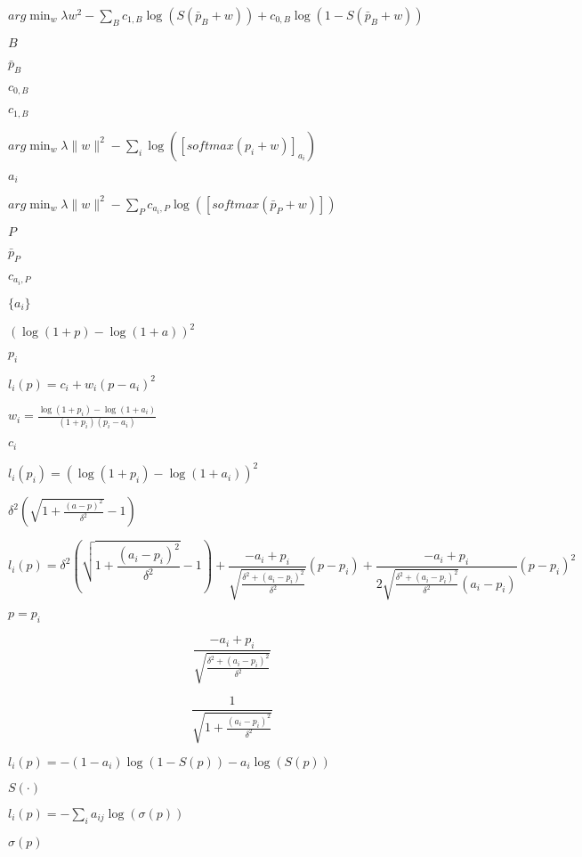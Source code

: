 \documentclass{article}
\begin{document}
$\displaystyle arg\min_w{ \lambda w^2 -\sum_{B}{ c_{1,B} \log(S(\bar{p}_B + w)) + c_{0,B} \log(1 - S(\bar{p}_B + w)) } }$
\pagebreak

$B$
\pagebreak

$\bar{p}_B$
\pagebreak

$c_{0,B}$
\pagebreak

$c_{1,B}$
\pagebreak

$\displaystyle arg\min_w{ \lambda \|w\|^2 -\sum_i{ \log([softmax(p_i + w)]_{a_i}) } }$
\pagebreak

$a_i$
\pagebreak

$\displaystyle arg\min_w{ \lambda \|w\|^2 -\sum_P{ c_{a_i, P} \log([softmax(\bar{p}_P + w)]) } }$
\pagebreak

$P$
\pagebreak

$\bar{p}_P$
\pagebreak

$c_{a_i, P}$
\pagebreak

$\{a_i\}$
\pagebreak

$(\log(1+p) - \log(1+a))^2$
\pagebreak

$p_i$
\pagebreak

$\displaystyle l_i(p) = c_i + w_i(p - a_i)^2$
\pagebreak

$w_i = \frac{\log(1+p_i) - \log(1+a_i)}{(1+p_i)(p_i-a_i)}$
\pagebreak

$c_i$
\pagebreak

$l_i(p_i) = (\log(1+p_i) - \log(1+a_i))^2$
\pagebreak

$\delta^2 (\sqrt{1 + \frac{(a - p)^2}{\delta^2}} - 1)$
\pagebreak

\[
    l_i(p) = \delta^2 \left(\sqrt{1 + \frac{(a_i - p_i)^{2}}{\delta^2}} - 1\right) +
             \frac{-a_i+p_i}{\sqrt{\frac{\delta^2 + (a_i-p_i)^{2}}{\delta^2}}} (p - p_i) +
             \frac{-a_i+p_i}{2\sqrt{\frac{\delta^2 + (a_i-p_i)^{2}}{\delta^2}}(a_i-p_i)} (p - p_i)^2
\]
\pagebreak

$p = p_i$
\pagebreak

\[\frac{-a_i + p_i}{\sqrt{\frac{\delta^2 + (a_i - p_i)^2}{\delta^2}}}\]
\pagebreak

\[\frac{1}{\sqrt{1 + \frac{(a_i - p_i)^2}{\delta^2}}}\]
\pagebreak

$\displaystyle l_i(p) = -(1 - a_i) \log(1 - S(p)) - a_i \log(S(p))$
\pagebreak

$S(\cdot)$
\pagebreak

$\displaystyle l_i(p) = -\sum_i a_{ij} \log(\sigma(p))$
\pagebreak

$\sigma(p)$
\pagebreak
\end{document}
